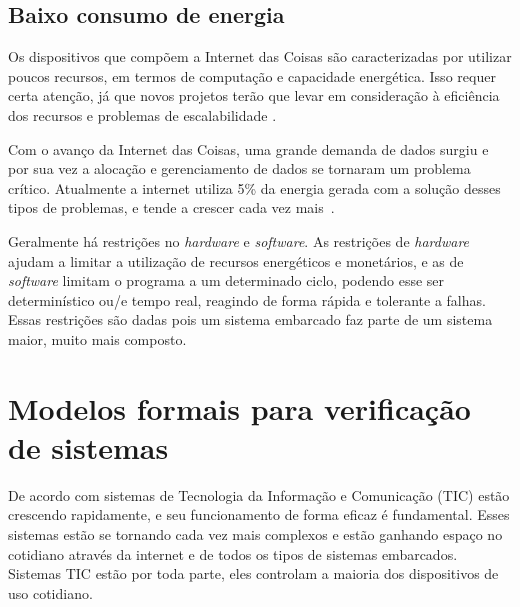 

\subsection{Baixo consumo de energia}

Os dispositivos que compõem a Internet das Coisas são caracterizadas por utilizar poucos recursos, em termos de computação e capacidade energética. Isso requer certa atenção, já que novos projetos terão que levar em consideração à eficiência dos recursos e problemas de escalabilidade \cite{atzori2010internet}.

Com o avanço da Internet das Coisas, uma grande demanda de dados surgiu e por sua vez a alocação e gerenciamento de dados se tornaram um problema crítico. Atualmente a internet utiliza 5\% da energia gerada com a solução desses tipos de problemas, e tende a crescer cada vez mais~\cite{Gubbi:2013}.

Geralmente há restrições no \textit{hardware} e \textit{software}. As restrições de \textit{hardware} ajudam a limitar a utilização de recursos energéticos e monetários, e as de \textit{software} limitam o programa a um determinado ciclo, podendo esse ser determinístico ou/e tempo real, reagindo de forma rápida e tolerante a falhas. Essas restrições são dadas pois um sistema embarcado faz parte de um sistema maior, muito mais composto. %



\section{Modelos formais para verificação de sistemas}
 
De acordo com  sistemas de Tecnologia da Informação e Comunicação (TIC) estão crescendo rapidamente, e seu funcionamento de forma eficaz é fundamental. Esses sistemas estão se tornando cada vez mais complexos e estão ganhando espaço no cotidiano através da internet e de todos os tipos de sistemas embarcados. Sistemas TIC estão por toda parte, eles controlam a maioria dos dispositivos de uso cotidiano.


